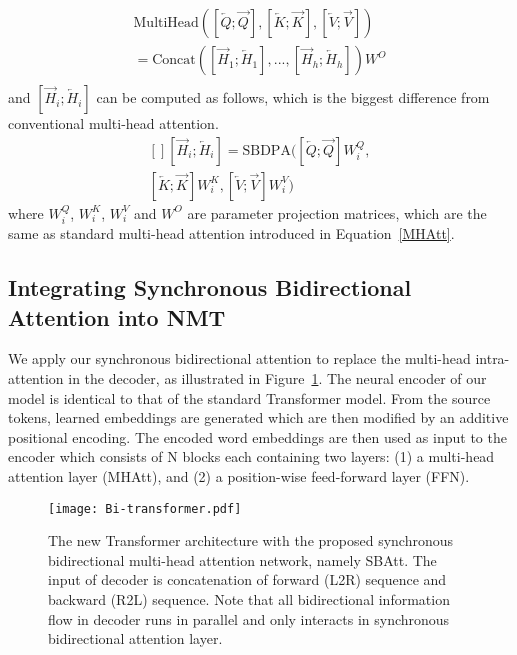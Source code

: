 \documentclass[11pt,a4paper]{article}
\begin{document}
\begin{CJK*}{UTF8}{gbsn}
\begin{equation}
\begin{aligned}
    \mbox{MultiHead}([\overleftarrow{Q};\overrightarrow{Q}],[\overleftarrow{K};\overrightarrow{K}],[\overleftarrow{V};\overrightarrow{V}]) \\
     = \mbox{Concat}([\overrightarrow{H}_{1};\overleftarrow{H}_{1}],...,[\overrightarrow{H}_{h};\overleftarrow{H}_{h}])W^O  \\
\end{aligned}
\end{equation}
and $[\overrightarrow{H}_{i};\overleftarrow{H}_{i}]$ can be computed as follows, which is the biggest difference from conventional multi-head attention.
\begin{equation}
\begin{aligned}
    [][\overrightarrow{H}_{i};\overleftarrow{H}_{i}] = {\mbox{SBDPA}}([\overleftarrow{Q};\overrightarrow{Q}]{W_i^Q}, \\
        [\overleftarrow{K};\overrightarrow{K}]W_i^K, [\overleftarrow{V};\overrightarrow{V}]W_i^V)
\end{aligned}
\end{equation}
where $W_i^Q$, $W_i^K$, $W_i^V$ and $W^O$ are parameter projection matrices, which are the same as standard multi-head attention introduced in Equation~\ref{MHAtt}.


\subsection{Integrating Synchronous Bidirectional Attention into NMT} \label{Integrating-sec}

We apply our synchronous bidirectional attention to replace the multi-head intra-attention in the decoder, as illustrated in Figure~\ref{Bi-transformer}.
The neural encoder of our model is identical to that of the standard Transformer model. From the source tokens, learned embeddings are generated which are then modified by an additive positional encoding. 
The encoded word embeddings are then used as input to the encoder which consists of N blocks each containing two layers: (1) a multi-head attention layer (MHAtt), and (2) a position-wise feed-forward layer (FFN).

\begin{figure}
	\centering
	\texttt{[image: Bi-transformer.pdf]}
	\caption{The new Transformer architecture with the proposed synchronous bidirectional multi-head attention network, namely SBAtt.
		The input of decoder is concatenation of forward (L2R) sequence and backward (R2L) sequence. Note that all bidirectional information flow in decoder runs in parallel and only interacts in synchronous bidirectional attention layer.
	}\label{Bi-transformer}
\end{figure}



\end{CJK*}
\end{document}
